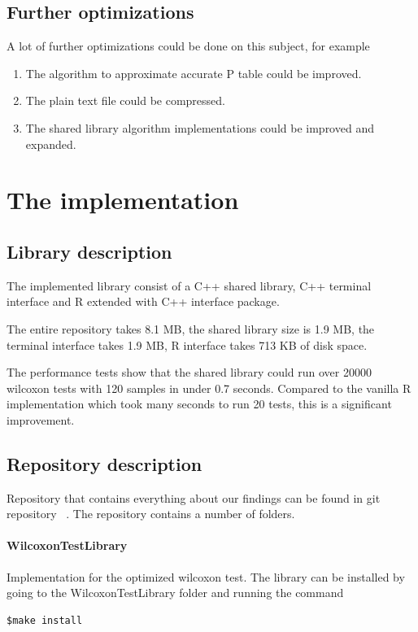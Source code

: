 \documentclass[12pt]{article}
\begin{document}
\subsection{Further optimizations}
A lot of further optimizations could be done on this subject, for example

\begin{enumerate}
\item The algorithm to approximate accurate P table could be improved.
\item The plain text file could be compressed.
\item The shared library algorithm implementations could be improved and expanded.
\end{enumerate}

\newpage

\section{The implementation}

\subsection{Library description}
The implemented library consist of a C++ shared library, C++ terminal interface and R extended with C++ interface package.

The entire repository takes 8.1 MB, the shared library size is 1.9 MB, the terminal interface takes 1.9 MB, R interface takes 713 KB of disk space.

The performance tests show that the shared library could run over 20000 wilcoxon tests with 120 samples in under 0.7 seconds. Compared to the vanilla R implementation which took many seconds to run 20 tests, this is a significant improvement.

\subsection{Repository description}

Repository that contains everything about our findings can be found in git repository ~\cite{wilx_repo}. The repository contains a number of folders.

\paragraph{WilcoxonTestLibrary}
Implementation for the optimized wilcoxon test. The library can be installed by going to the WilcoxonTestLibrary folder and running the command
\begin{lstlisting}
$make install
\end{lstlisting}
\end{document}

